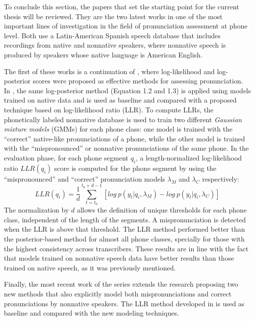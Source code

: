 To conclude this section, the papers that set the starting point for the current thesis will
be reviewed. They are the two latest works in one of the most important lines of investigation
in the field of pronunciation assessment at phone level. 
Both use a Latin-American Spanish speech database that includes recordings from 
native and nonnative speakers, where nonnative speech
is produced by speakers whose native language is American English.

The first of these works \cite{detection_phone_level_mispronunciation_learning} is 
a continuation of \cite{pronunciation_scoring_phone_segments_instruction}, 
where log-likelihood and log-posterior scores were proposed as effective methods for 
assessing pronunciation. In \cite{detection_phone_level_mispronunciation_learning}, 
the same log-posterior method (Equation 1.2 and 1.3) is applied using models trained on native
data and is used as baseline and compared with a proposed technique 
based on log-likelihood ratio (LLR).
To compute LLRs, the phonetically labeled nonnative
database is used to train two different \textit{Gaussian mixture models} (GMMs) for each phone
class: one model is trained with the ``correct'' native-like pronunciations of a phone, while the
other model is trained with the ``mispronounced'' or nonnative pronunciations of the same phone.
In the evaluation phase, for each phone segment $q_{i}$, a length-normalized log-likelihood ratio
$LLR(q_{i})$ score is computed for the phone segment by using the ``mispronounced'' and ``correct''
pronunciation models $\lambda_{M}$ and $\lambda_{C}$ respectively:
\begin{equation}
LLR(q_{i}) = \frac{1}{d}\sum_{t=t_{0}}^{t_{0}+d-1} [log \ p(y_{t}|q_{i}, \lambda_{M}) - log \ p(y_{t}|q_{i}, \lambda_{C})]
\end{equation}
The normalization by $d$ allows the definition of unique thresholds for each phone class, 
independent of the length of the segments. A mispronunciation is detected when the LLR is above that threshold. 
The LLR method performed better than the posterior-based method for almost all phone classes, 
specially for those with the highest consistency across transcribers. These results are in
line with the fact that models trained on nonnative speech data have better results than
those trained on native speech, as it was previously mentioned.

Finally, the most recent work of the series \cite{main} extends the research 
proposing two new methods that also explicitly model both mispronunciations and correct pronunciations 
by nonnative speakers. The LLR method developed in 
\cite{detection_phone_level_mispronunciation_learning} is used as baseline and compared with
the new modeling techniques. 

